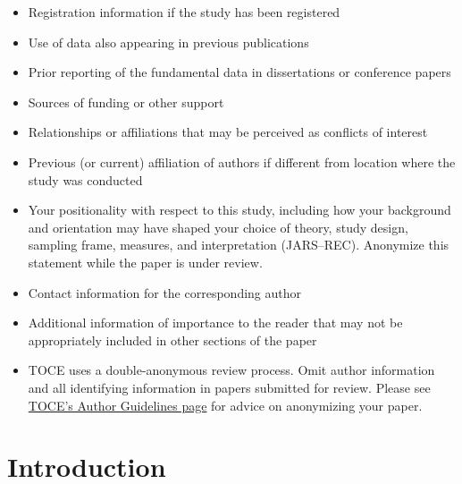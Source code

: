 \documentclass[acmsmall,screen,anonymous,review]{acmart}
\begin{document}
\begin{itemize}
    \item Registration information if the study has been registered
    \item Use of data also appearing in previous publications
    \item Prior reporting of the fundamental data in dissertations or conference papers
    \item Sources of funding or other support
    \item Relationships or affiliations that may be perceived as conflicts of interest
    \item Previous (or current) affiliation of authors if different from location where the study  was conducted
    \item Your positionality with respect to this study, including how your background and orientation may have shaped your choice of theory, study design, sampling frame, measures, and interpretation (JARS--REC). Anonymize this statement while the paper is under review.
    \item Contact information for the corresponding author
    \item Additional information of importance to the reader that may not be appropriately included in other sections of the paper
    \item TOCE uses a double-anonymous review process. Omit author information and all identifying information in papers submitted for review. Please see \href{https://dl.acm.org/journal/toce/author-guidelines}{TOCE’s Author Guidelines page} for advice on anonymizing your paper.
\end{itemize}


\section{Introduction}
\end{document}
